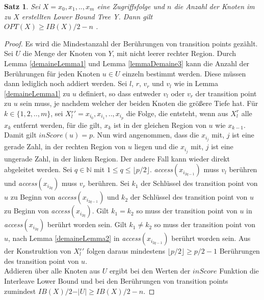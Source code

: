 \documentclass[a4paper,12pt]{article}
\newtheorem{Satz}{Satz}[section]
\begin{document}
\begin{Satz} \label{satzDemaine1}
	Sei $X = x_0, x_1,.., x_m$  eine Zugriffsfolge und $n$ die Anzahl der Knoten im zu $X$ erstellten Lower Bound Tree Y. Dann gilt\\	
	$\mathit{OPT}\left(X\right) \geq \mathit{IB}\left(X\right) /2 - n$ .
\end{Satz}
\begin{proof}
	Es wird die Mindestanzahl der Berührungen von transition points gezählt. Sei $U$ die Menge der Knoten von $Y$, mit nicht leerer rechter Region. Durch Lemma \ref{demaineLemma1} und Lemma \ref{lemmaDemaine3} kann die Anzahl der Berührungen für jeden Knoten $u \in U$ einzeln bestimmt werden. Diese müssen dann lediglich noch addiert werden. Sei $l$, $r$, $v_r$ und $v_l$ wie in Lemma \ref{demaineLemma1} zu $u$ definiert, so dass entweder $v_l$ oder $v_r$ der transition point zu $u$ sein muss, je nachdem welcher der beiden Knoten die größere Tiefe hat. Für $k \in \{1, 2,.., m\}$, sei \mbox{$X{^r_l}' = x_{i_0},x_{i_1},..,x_{i_p}$} die Folge, die entsteht, wenn aus $X^r_l$ alle $x_k$ entfernt werden, für die gilt, $x_k$ ist in der gleichen Region von $u$ wie $x_{k-1}$. Damit gilt $\mathit{inScore}\left(u\right) = p$. Nun wird angenommen, dass die $x_{i_j}$ mit, $j$ ist eine gerade Zahl, in der rechten Region von $u$ liegen und die $x_{i_j}$ mit, $j$ ist eine ungerade Zahl, in der linken Region. Der andere Fall kann wieder direkt abgeleitet werden. Sei $q \in \mathbb{N}$ mit $1 \leq q \leq \lfloor p / 2 \rfloor$. \textit{access}$\left( x_{i_{2q-1}} \right)$ muss $v_l$ berühren und \textit{access}$\left( x_{i_{2q}} \right)$ muss $v_r$ berühren. Sei $k_{1}$ der Schlüssel des transition point von $u$ zu Beginn von \textit{access}$\left( x_{i_{2q-1}} \right)$ und  $k_{2}$ der Schlüssel des transition point von $u$ zu Beginn von \textit{access}$\left( x_{i_{2q}} \right)$. Gilt $k_{1} = k_{2}$ so muss der transition point von $u$ in \textit{access}$\left( x_{i_{2q}} \right)$ berührt worden sein.  Gilt $k_{1} \ne k_{2}$ so muss der transition point von $u$, nach Lemma \ref{demaineLemma2} in \textit{access}$\left( x_{i_{2q-1}} \right)$ berührt worden sein. Aus der Konstruktion von $X{^r_l}'$ folgen daraus mindestens $\lfloor p/2 \rfloor \geq p/2 - 1$ Berührungen des transition point von $u$. \\
	Addieren über alle Knoten aus $U$ ergibt bei den Werten der $\mathit{inScore}$ Funktion die Interleave Lower Bound und bei den Berührungen von transition points zumindest  $\mathit{IB}\left(X\right) /2 - \vert U \vert \geq \mathit{IB}\left(X\right) /2 - n$.
	
\end{proof}
\end{document}
